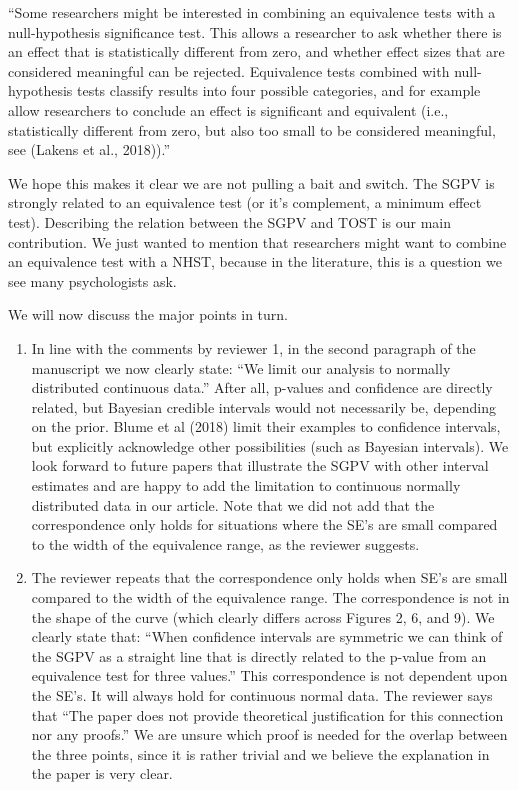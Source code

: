 \documentclass[man]{apa6}
\begin{document}
\enquote{Some researchers might be interested in combining an equivalence tests with a null-hypothesis significance test. This allows a researcher to ask whether there is an effect that is statistically different from zero, and whether effect sizes that are considered meaningful can be rejected. Equivalence tests combined with null-hypothesis tests classify results into four possible categories, and for example allow researchers to conclude an effect is significant and equivalent (i.e., statistically different from zero, but also too small to be considered meaningful, see (Lakens et al., 2018)).}

We hope this makes it clear we are not pulling a bait and switch. The SGPV is strongly related to an equivalence test (or it's complement, a minimum effect test). Describing the relation between the SGPV and TOST is our main contribution. We just wanted to mention that researchers might want to combine an equivalence test with a NHST, because in the literature, this is a question we see many psychologists ask.

We will now discuss the major points in turn.

\begin{enumerate}
\def\labelenumi{\arabic{enumi}.}
\item
  In line with the comments by reviewer 1, in the second paragraph of the manuscript we now clearly state: \enquote{We limit our analysis to normally distributed continuous data.} After all, p-values and confidence are directly related, but Bayesian credible intervals would not necessarily be, depending on the prior. Blume et al (2018) limit their examples to confidence intervals, but explicitly acknowledge other possibilities (such as Bayesian intervals). We look forward to future papers that illustrate the SGPV with other interval estimates and are happy to add the limitation to continuous normally distributed data in our article. Note that we did not add that the correspondence only holds for situations where the SE's are small compared to the width of the equivalence range, as the reviewer suggests.
\item
  The reviewer repeats that the correspondence only holds when SE's are small compared to the width of the equivalence range. The correspondence is not in the shape of the curve (which clearly differs across Figures 2, 6, and 9). We clearly state that: \enquote{When confidence intervals are symmetric we can think of the SGPV as a straight line that is directly related to the p-value from an equivalence test for three values.} This correspondence is not dependent upon the SE's. It will always hold for continuous normal data. The reviewer says that \enquote{The paper does not provide theoretical justification for this connection nor any proofs.} We are unsure which proof is needed for the overlap between the three points, since it is rather trivial and we believe the explanation in the paper is very clear.
\end{enumerate}
\end{document}

